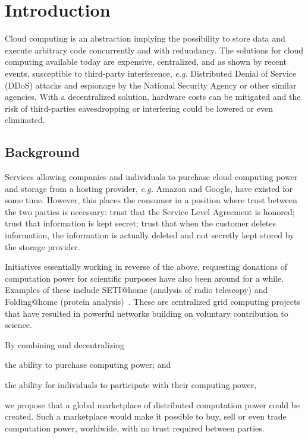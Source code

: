 \chapter{Introduction}
Cloud computing is an abstraction implying the possibility to store data and execute arbitrary code concurrently and with redundancy. The solutions for cloud computing available today are expensive, centralized, and as shown by recent events, susceptible to third-party interference, \emph{e.g.} Distributed Denial of Service (DDoS) attacks and espionage by the National Security Agency or other similar agencies. With a decentralized solution, hardware costs can be mitigated and the risk of third-parties eavesdropping or interfering could be lowered or even eliminated.

\section{Background}
Services allowing companies and individuals to purchase cloud computing power and storage from a hosting provider, \emph{e.g.} Amazon and Google, have existed for some time. However, this places the consumer in a position where trust between the two parties is necessary: trust that the Service Level Agreement is honored; trust that information is kept secret; trust that when the customer deletes information, the information is actually deleted and not secretly kept stored by the storage provider.

Initiatives essentially working in reverse of the above, requesting donations of computation power for scientific purposes have also been around for a while. Examples of these include SETI@home (analysis of radio telescopy) and Folding@home (protein analysis)~\cite{korpela:2012}. These are centralized grid computing projects that have resulted in powerful networks building on voluntary contribution to science.

By combining and decentralizing
\begin{inparaenum}
\item the ability to purchase computing power; and
\item the ability for individuals to participate with their computing power,
\end{inparaenum}
we propose that a global marketplace of distributed computation power could be created. Such a marketplace would make it possible to buy, sell or even trade computation power, worldwide, with no trust required between parties.

